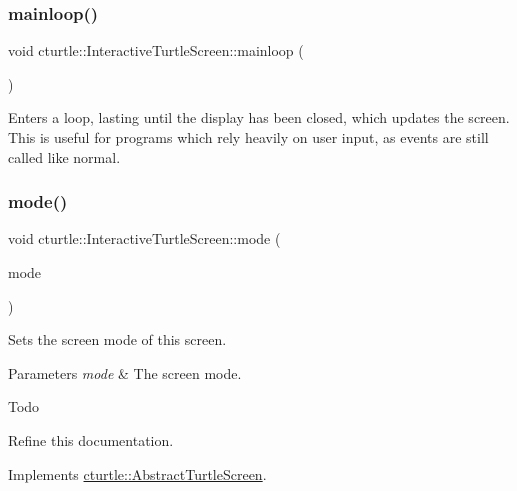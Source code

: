 \subsubsection{\texorpdfstring{mainloop()}{mainloop()}}
{\footnotesize\ttfamily void cturtle\+::\+Interactive\+Turtle\+Screen\+::mainloop (\begin{DoxyParamCaption}{ }\end{DoxyParamCaption})\hspace{0.3cm}{\ttfamily [inline]}}

Enters a loop, lasting until the display has been closed, which updates the screen. This is useful for programs which rely heavily on user input, as events are still called like normal. \mbox{\label{classcturtle_1_1InteractiveTurtleScreen_a1c666afe65211cf9eedaffa17206a697}} 
\subsubsection{\texorpdfstring{mode()}{mode()}\hspace{0.1cm}{\footnotesize\ttfamily [1/2]}}
{\footnotesize\ttfamily void cturtle\+::\+Interactive\+Turtle\+Screen\+::mode (\begin{DoxyParamCaption}\item[{Screen\+Mode}]{mode }\end{DoxyParamCaption})\hspace{0.3cm}{\ttfamily [virtual]}}

Sets the screen mode of this screen. 
\begin{DoxyParams}{Parameters}
{\em mode} & The screen mode. \\
\hline
\end{DoxyParams}
\begin{DoxyRefDesc}{Todo}
\item[\hyperlink{todo__todo000001}{Todo}]Refine this documentation. \end{DoxyRefDesc}


Implements \hyperlink{classcturtle_1_1AbstractTurtleScreen}{cturtle\+::\+Abstract\+Turtle\+Screen}.

\mbox{\label{classcturtle_1_1InteractiveTurtleScreen_af65c66dbfe93fa748944f7a6d299080e}} 
